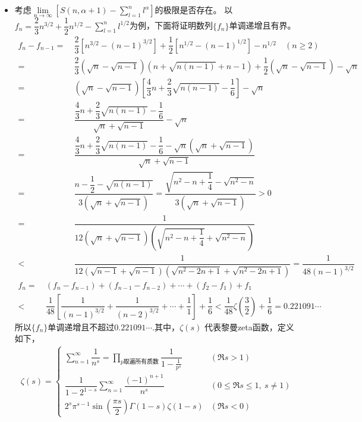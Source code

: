 \begin{itemize}[leftmargin=\inteval{\myitemleftmargin}pt,itemsep=
   \inteval{\myitemitempsep}pt,topsep=\inteval{\myitemtopsep}pt]
\item 考虑$ \lim\limits_{n\to \infty}\left[S(n,\alpha+1)-\sum\limits_{l=1}^{n} l^{\alpha}\right] $的极限是否存在。
以$ f_n=\dfrac{2}{3}n^{3/2}+\dfrac{1}{2}n^{1/2}-\sum\limits_{l=1}^{n} 
l^{1/2} $为例，下面将证明数列$ \{f_n\} $单调递增且有界。
\begin{align*}
    f_n-f_{n-1}=&\ \dfrac{2}{3}\left[n^{3/2}-(n-1)^{3/2}\right]
    +\dfrac{1}{2}\left[n^{1/2}-(n-1)^{1/2}\right]-n^{1/2} \quad (n\geq 2)\\
    =&\ \dfrac{2}{3}(\sqrt{n}-\sqrt{n-1})(n+\sqrt{n(n-1)}+n-1)
    +\dfrac{1}{2}(\sqrt{n}-\sqrt{n-1})-\sqrt{n} \\
    =&\ (\sqrt{n}-\sqrt{n-1})\left[\dfrac{4}{3}n+\dfrac{2}{3}
    \sqrt{n(n-1)}-\dfrac{1}{6}\right]-\sqrt{n} \\
    =&\ \dfrac{\dfrac{4}{3}n+\dfrac{2}{3}
        \sqrt{n(n-1)}-\dfrac{1}{6}}{\sqrt{n}+\sqrt{n-1}}-\sqrt{n} \\
    =&\ \dfrac{\dfrac{4}{3}n+\dfrac{2}{3}\sqrt{n(n-1)}-\dfrac{1}{6}-
        \sqrt{n}(\sqrt{n}+\sqrt{n-1})}{\sqrt{n}+\sqrt{n-1}} \\
    =&\ \dfrac{n-\dfrac{1}{2}-\sqrt{n(n-1)}}{3(\sqrt{n}+\sqrt{n-1})}
    =\dfrac{\sqrt{n^2-n+\dfrac{1}{4}}-\sqrt{n^2-n}}{3(\sqrt{n}+\sqrt{n-1})}>0 \\
    =&\ \dfrac{1}{12(\sqrt{n}+\sqrt{n-1})\left(\sqrt{n^2-n+\dfrac{1}{4}}+
        \sqrt{n^2-n}\right)} \\
    <&\ \dfrac{1}{12(\sqrt{n-1}+\sqrt{n-1})\left(\sqrt{n^2-2n+1}+\sqrt{n^2-2n+1}
        \right)}=\dfrac{1}{48(n-1)^{3/2}}
\end{align*}
\begin{align*}
    f_n=&\ (f_{n}-f_{n-1})+(f_{n-1}-f_{n-2})+\cdots+(f_{2}-f_{1})+f_1 \\
    <&\ \dfrac{1}{48}\left[\dfrac{1}{(n-1)^{3/2}}+\dfrac{1}{(n-2)^{3/2}}
    +\cdots+\dfrac{1}{1}\right]+\dfrac{1}{6} <\dfrac{1}{48}\zeta\left(
    \dfrac{3}{2}\right)+\dfrac{1}{6}=0.221091\cdots
\end{align*}
所以$ \{f_n\} $单调递增且不超过$ 0.221091\cdots $.其中，$ \zeta(s) $
代表黎曼zeta函数，定义如下，
\begin{align*}
\zeta(s)=
\begin{cases}
    \sum\limits_{n=1}^{\infty} \dfrac{1}{n^s}
    =\prod_{p\text{取遍所有质数}}\dfrac{1}{1-\frac{1}{p^s}}  & (\Re s>1)  \\
    \dfrac{1}{1-2^{1-s}}\sum_{n=1}^{\infty}
    \dfrac{(-1)^{n+1}}{n^s}  & (0\leq \Re s\leq 1,\ s\neq 1)   \\
    2^s\pi^{s-1}\sin\left(\dfrac{\pi s}{2}\right)\Gamma(1-s)
    \zeta(1-s) & (\Re s<0) 
\end{cases} 
\end{align*}


\end{itemize}
